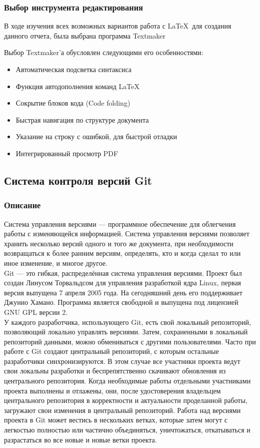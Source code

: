 \documentclass{article}
\begin{document}
		\subsubsection{Выбор инструмента редактирования}
			В ходе изучения всех возможных вариантов работа с \LaTeX ~для создания данного отчета, была выбрана программа Textmaker
			
			Выбор Textmaker'а обусловлен следующими его особенностями:
			\begin{itemize} 
	    		\item	Автоматическая подсветка синтаксиса
	    		\item	Функция автодополнения команд \LaTeX
	    		\item	Сокрытие блоков кода (Code folding)
	    		\item	Быстрая навигация по структуре документа
	    		\item	Указание на строку с ошибкой, для быстрой отладки
	    		\item	Интегрированный просмотр PDF
			\end{itemize} 
	\newpage
	\subsection{Система контроля версий Git}
		\subsubsection{Описание}
		Система управления версиями — программное обеспечение для облегчения работы с изменяющейся информацией. Система управления версиями позволяет хранить несколько версий одного и того же документа, при необходимости возвращаться к более ранним версиям, определять, кто и когда сделал то или иное изменение, и многое другое.\\
		
		Git — это гибкая, распределённая система управления версиями. Проект был создан Линусом Торвальдсом для управления разработкой ядра Linux, первая версия выпущена 7 апреля 2005 года. На сегодняшний день его поддерживает Джунио Хамано. Программа является свободной и выпущена под лицензией GNU GPL версии 2.\\ 
		
	У каждого разработчика, использующего Git, есть свой локальный репозиторий, позволяющий локально управлять версиями. Затем, сохраненными в локальный репозиторий данными, можно обмениваться с другими пользователями. Часто при работе с Git создают центральный репозиторий, с которым остальные разработчики синхронизируются. В этом случае все участники проекта ведут свои локальны разработки и беспрепятственно скачивают обновления из центрального репозитория. Когда необходимые работы отдельными участниками проекта выполнены и отлажены, они, после удостоверения владельцем центрального репозитория в корректности и актуальности проделанной работы, загружают свои изменения в центральный репозиторий. Работа над версиями проекта в Git может вестись в нескольких ветках, которые затем могут с легкостью полностью или частично объединяться, уничтожаться, откатываться и разрастаться во все новые и новые ветки проекта.\\
\end{document}
